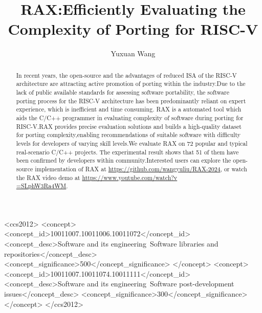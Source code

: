 \documentclass[sigconf,screen,review,anonymous]{acmart}
\begin{document}
\title{RAX:Efficiently Evaluating the Complexity of Porting for RISC-V}

\author{Yuxuan Wang}

\renewcommand{\shortauthors}{Yuxuan et al.}

\begin{abstract}
  In recent years, the open-source and the advantages of reduced ISA of the RISC-V architecture are attracting active promotion of porting within the industry.Due to the lack of public available standards for assessing software portability, the software porting process for the RISC-V architecture has been predominantly reliant on expert experience, which is inefficient and time consuming. RAX is a automated tool which aids the C/C++ programmer in evaluating  complexity of software during porting for RISC-V.RAX provides precise evaluation solutions and builds a high-quality dataset for porting complexity,enabling recommendations of suitable software with difficulty levels for developers of varying skill levels.We evaluate RAX on 72 popular and typical real-scenario C/C++ projects. The experimental result shows that 51 of them have been confirmed by developers within community.Interested users can explore the open-source implementation of RAX at \href{https://github.com/wangyuliu/RAX-2024}{https://github.com/wangyuliu/RAX-2024}, or watch the RAX video demo at \href{https://www.youtube.com/watch?v=SLphW3Ra4WM}{https://www.youtube.com/watch?v\\=SLphW3Ra4WM}.
\end{abstract}

\begin{CCSXML}
<ccs2012>
    <concept>
        <concept_id>10011007.10011006.10011072</concept_id>
        <concept_desc>Software and its engineering~Software libraries and repositories</concept_desc>
        <concept_significance>500</concept_significance>
        </concept>
    <concept>
        <concept_id>10011007.10011074.10011111</concept_id>
        <concept_desc>Software and its engineering~Software post-development issues</concept_desc>
        <concept_significance>300</concept_significance>
    </concept>
</ccs2012>
\end{CCSXML}
  
\end{document}
